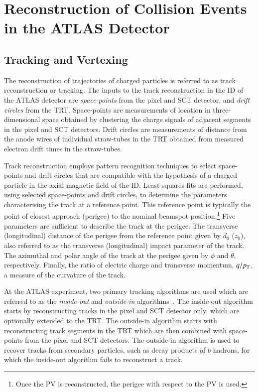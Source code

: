 \section{Reconstruction of Collision Events in the ATLAS Detector}%
\label{sec:object_reco_at_atlas}



\subsection{Tracking and Vertexing}

The reconstruction of trajectories of charged particles is referred to as track
reconstruction or tracking. The inputs to the track reconstruction in the ID of
the ATLAS detector are \emph{space-points} from the pixel and SCT detector, and
\emph{drift circles} from the TRT. Space-points are measurements of location in
three-dimensional space obtained by clustering the charge signals of adjacent
segments in the pixel and SCT detectors. Drift circles are measurements of
distance from the anode wires of individual straw-tubes in the TRT obtained from
measured electron drift times in the straw-tubes.

Track reconstruction employs pattern recognition techniques to select
space-points and drift circles that are compatible with the hypothesis of a
charged particle in the axial magnetic field of the ID. Least-squares fits are
performed, using selected space-points and drift circles, to determine the
parameters characterising the track at a reference point. This reference point
is typically the point of closest approach (perigee) to the nominal beamspot
position.\footnote{Once the PV is reconstructed, the perigee with respect to the
  PV is used.} Five parameters are sufficient to describe the track at the
perigee. The transverse (longitudinal) distance of the perigee from the
reference point given by $d_0$ ($z_0$), also referred to as the transverse
(longitudinal) impact parameter of the track. The azimuthal and polar angle of
the track at the perigee given by $\phi$ and $\theta$, respectively. Finally,
the ratio of electric charge and transverse momentum, $q / p_{\text{T}}$, a measure of
the curvature of the track.

At the ATLAS experiment, two primary tracking algorithms are used which are
referred to as the \emph{inside-out} and \emph{outside-in}
algorithms~\cite{Cornelissen:2007vba,Salzburger:2015sgq,PERF-2015-08}. The
inside-out algorithm starts by reconstructing tracks in the pixel and SCT
detector only, which are optionally extended to the TRT. The outside-in
algorithm starts with reconstructing track segments in the TRT which are then
combined with space-points from the pixel and SCT detectors. The outside-in
algorithm is used to recover tracks from secondary particles, such as decay
products of $b$-hadrons, for which the inside-out algorithm fails to reconstruct
a track.





